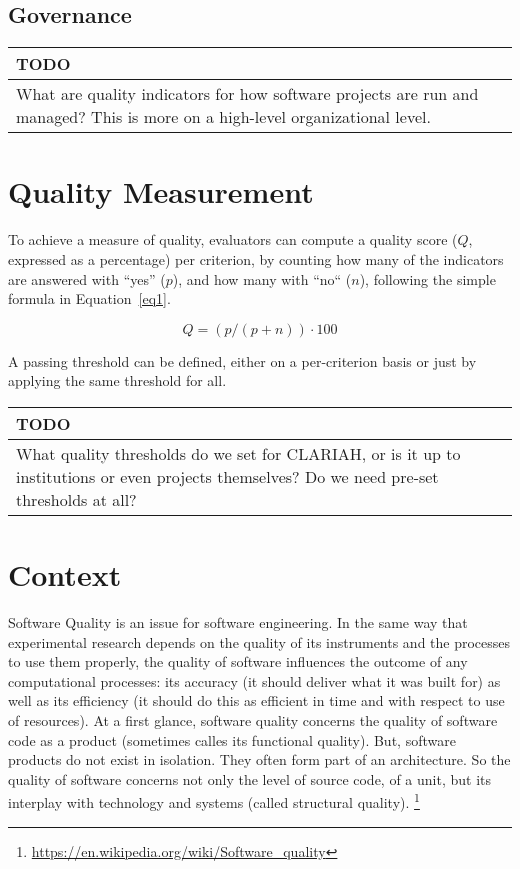 \documentclass[a4paper,11pt]{article}
\newenvironment{TODO}{
\begin{center}
    \begin{tabular}[h!]{|p{0.8\textwidth}|}
    \hline
    {\bf TODO}\\\hline}
{   \\\hline
    \end{tabular}
\end{center}}
\begin{document}
\subsection{Governance}




\begin{TODO} 
What are quality indicators for how software projects are run and
managed? This is more on a high-level organizational level.
\end{TODO}

\section{Quality Measurement}

To achieve a measure of quality, evaluators can compute a quality score ($Q$,
expressed as a percentage) per criterion, by counting how many of the
indicators are answered with ``yes'' ($p$), and how many with ``no`` ($n$),
following the simple formula in Equation~\ref{eq1}.

\begin{equation}
\label{eq1}
Q = (p / (p + n)) \cdot 100
\end{equation}

A passing threshold can be defined, either on a per-criterion basis or just
by applying the same threshold for all. 

\begin{TODO}
What quality thresholds do we set for CLARIAH, or is it up
to institutions or even projects themselves? Do we need pre-set thresholds at
all?
\end{TODO}

\section{Context}

Software Quality is an issue for software engineering. In the same way that
experimental research depends on the quality of its instruments and the
processes to use them properly, the quality of software influences the outcome
of any computational processes: its accuracy (it should deliver what it
was built for) as well as its efficiency (it should do this as efficient in
time and with respect to use of resources). At a first glance, software
quality concerns the quality of software code as a product (sometimes
calles its functional quality). But, software products do not exist in
isolation. They often form part of an architecture. So the quality of software
concerns not only the level of source code, of a unit, but its interplay
with technology and systems (called structural quality).
\footnote{\url{https://en.wikipedia.org/wiki/Software\_quality}}
\end{document}
